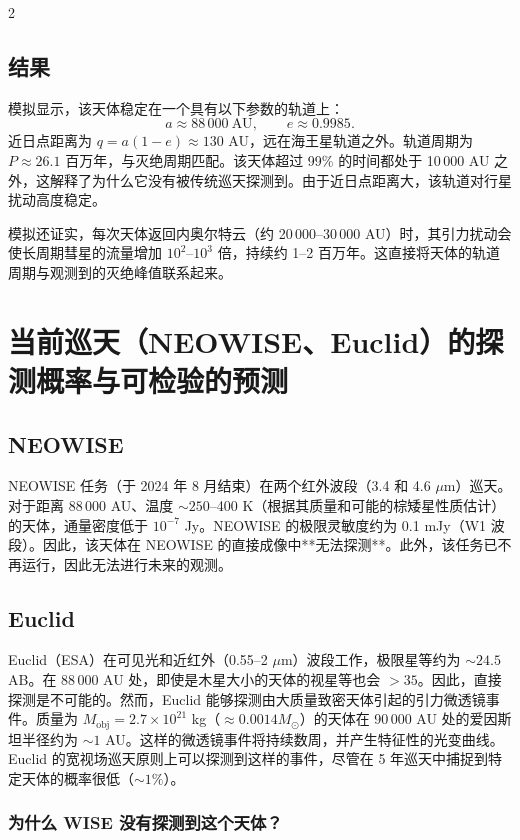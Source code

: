 \documentclass[11pt,a4paper]{article}
\begin{document}
\begin{multicols}{2}
		\subsection{结果}
		
		模拟显示，该天体稳定在一个具有以下参数的轨道上：
		\[
		a \approx 88\,000\ \text{AU},\qquad e \approx 0.9985.
		\]
		近日点距离为 \(q = a(1-e) \approx 130\) AU，远在海王星轨道之外。轨道周期为 \(P \approx 26.1\) 百万年，与灭绝周期匹配。该天体超过 99\% 的时间都处于 10\,000 AU 之外，这解释了为什么它没有被传统巡天探测到。由于近日点距离大，该轨道对行星扰动高度稳定。
		
		模拟还证实，每次天体返回内奥尔特云（约 20\,000–30\,000 AU）时，其引力扰动会使长周期彗星的流量增加 \(10^2\)–\(10^3\) 倍，持续约 1–2 百万年。这直接将天体的轨道周期与观测到的灭绝峰值联系起来。
		
		\section{当前巡天（NEOWISE、Euclid）的探测概率与可检验的预测}
		
		\subsection{NEOWISE}
		
		NEOWISE 任务（于 2024 年 8 月结束）在两个红外波段（3.4 和 4.6 \(\mu\)m）巡天。对于距离 88\,000 AU、温度 \(\sim 250\)–400 K（根据其质量和可能的棕矮星性质估计）的天体，通量密度低于 \(10^{-7}\) Jy。NEOWISE 的极限灵敏度约为 0.1 mJy（W1 波段）。因此，该天体在 NEOWISE 的直接成像中**无法探测**。此外，该任务已不再运行，因此无法进行未来的观测。
		
		\subsection{Euclid}
		
		Euclid（ESA）在可见光和近红外（0.55–2 \(\mu\)m）波段工作，极限星等约为 \(\sim 24.5\) AB。在 88\,000 AU 处，即使是木星大小的天体的视星等也会 \(>35\)。因此，直接探测是不可能的。然而，Euclid 能够探测由大质量致密天体引起的引力微透镜事件。质量为 \(M_{\text{obj}} = 2.7\times10^{21}\) kg（\(\approx 0.0014 M_{\odot}\)）的天体在 90\,000 AU 处的爱因斯坦半径约为 \(\sim 1\) AU。这样的微透镜事件将持续数周，并产生特征性的光变曲线。Euclid 的宽视场巡天原则上可以探测到这样的事件，尽管在 5 年巡天中捕捉到特定天体的概率很低（\(\sim 1\%\)）。
		
		\subsubsection{为什么 WISE 没有探测到这个天体？}
		

\end{multicols}
\end{document}
